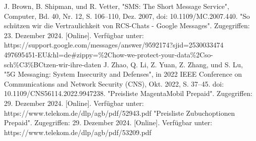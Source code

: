 \documentclass[conference]{IEEEtran}
\begin{document}
\begin{thebibliography}{00}
     J. Brown, B. Shipman, und R. Vetter, "SMS: The Short Message Service", Computer, Bd. 40, Nr. 12, S. 106–110, Dez. 2007, doi: 10.1109/MC.2007.440.
     "So schützen wir die Vertraulichkeit von RCS-Chats - Google Messages". Zugegriffen: 23. Dezember 2024. [Online]. Verfügbar unter: https://support.google.com/messages/answer/9592174?sjid=2530033474
    497695451-EU\&hl=de\#zippy=\%2Chow-we-protect-your-data\%2Cso-sch\%C3\%BCtzen-wir-ihre-daten
     J. Zhao, Q. Li, Z. Yuan, Z. Zhang, und S. Lu, "5G Messaging: System Insecurity and Defenses", in 2022 IEEE Conference on Communications and Network Security (CNS), Okt. 2022, S. 37–45. doi: 10.1109/CNS56114.2022.9947238.
     "Preisliste MagentaMobil Prepaid". Zugegriffen: 29. Dezember 2024. [Online]. Verfügbar unter: https://www.telekom.de/dlp/agb/pdf/52943.pdf
     "Preisliste Zubuchoptionen Prepaid". Zugegriffen: 29. Dezember 2024. [Online]. Verfügbar unter: https://www.telekom.de/dlp/agb/pdf/53209.pdf
\end{thebibliography}
\end{document}
